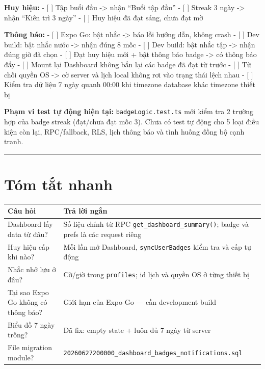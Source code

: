 \documentclass[12pt,a4paper]{article}
\newcounter{none}
\begin{document}
\textbf{Huy hiệu:} - {[} {]} Tập buổi đầu -\textgreater{} nhận ``Buổi
tập đầu'' - {[} {]} Streak 3 ngày -\textgreater{} nhận ``Kiên trì 3
ngày'' - {[} {]} Huy hiệu đã đạt sáng, chưa đạt mờ

\textbf{Thông báo:} - {[} {]} Expo Go: bật nhắc -\textgreater{} báo lỗi
hướng dẫn, không crash - {[} {]} Dev build: bật nhắc nước
-\textgreater{} nhận đúng 8 mốc - {[} {]} Dev build: bật nhắc tập
-\textgreater{} nhận đúng giờ đã chọn - {[} {]} Đạt huy hiệu mới + bật
thông báo badge -\textgreater{} có thông báo đẩy - {[} {]} Mount lại
Dashboard không bắn lại các badge đã đạt từ trước - {[} {]} Từ chối
quyền OS -\textgreater{} cờ server và lịch local không rơi vào trạng
thái lệch nhau - {[} {]} Kiểm tra dữ liệu 7 ngày quanh 00:00 khi
timezone database khác timezone thiết bị

\textbf{Phạm vi test tự động hiện tại:} \texttt{badgeLogic.test.ts} mới
kiểm tra 2 trường hợp của badge streak (đạt/chưa đạt mốc 3). Chưa có
test tự động cho 5 loại điều kiện còn lại, RPC/fallback, RLS, lịch thông
báo và tình huống đồng bộ cạnh tranh.

\begin{center}\rule{0.5\linewidth}{0.5pt}\end{center}

\section{Tóm tắt nhanh}\label{tuxf3m-tux1eaft-nhanh}

{\def\LTcaptype{none} %
\begin{longtable}[]{@{}
  >{\raggedright\arraybackslash}p{}
  >{\raggedright\arraybackslash}p{}@{}}
\toprule\noalign{}
\begin{minipage}[b]{\linewidth}\raggedright
Câu hỏi
\end{minipage} & \begin{minipage}[b]{\linewidth}\raggedright
Trả lời ngắn
\end{minipage} \\
\midrule\noalign{}
\endhead
\bottomrule\noalign{}
\endlastfoot
Dashboard lấy data từ đâu? & Số liệu chính từ RPC
\texttt{get\_dashboard\_summary()}; badge và prefs là các request
riêng \\
Huy hiệu cấp khi nào? & Mỗi lần mở Dashboard, \texttt{syncUserBadges}
kiểm tra và cấp tự động \\
Nhắc nhở lưu ở đâu? & Cờ/giờ trong \texttt{profiles}; id lịch và quyền
OS ở từng thiết bị \\
Tại sao Expo Go không có thông báo? & Giới hạn của Expo Go --- cần
development build \\
Biểu đồ 7 ngày trống? & Đã fix: empty state + luôn đủ 7 ngày từ
server \\
File migration module? &
\texttt{20260627200000\_dashboard\_badges\_notifications.sql} \\
\end{longtable}
}
\end{document}
